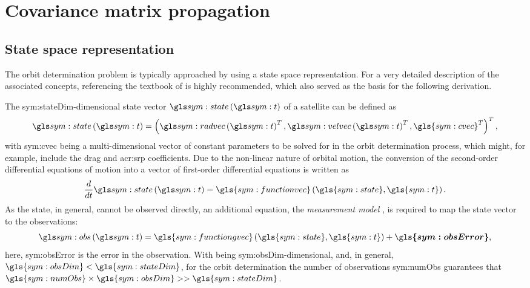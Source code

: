 \section{Covariance matrix propagation}
\label{sec:propagation-covariance}

\subsection{State space representation}
\label{sec:state-space-notation}

The orbit determination problem is typically approached by using a state space representation. For a very detailed description of the associated concepts, referencing the textbook
of \citet{tapley2004} is highly recommended, which also served as the basis for the following derivation. 

The \gls{sym:stateDim}-dimensional state vector $\xt$ of a satellite can be defined as
\begin{equation}
 \xt = \left(\rt^T, \vt^T, \gls{sym:cvec}^T \right)^T,
\end{equation}
with \gls{sym:cvec} being a multi-dimensional vector of constant parameters to be solved for in the orbit determination process, which might, for example,
include the drag and \acrshort{acr:srp} coefficients. Due to the non-linear nature of orbital motion, the conversion of the second-order differential equations of motion into a vector of first-order differential equations is written as
\begin{equation}
 \frac{d}{dt} \xt = \gls{sym:functionvec}\left(\gls{sym:state},\gls{sym:t}\right). \label{eq:non-linear-system}
\end{equation}
As the state, in general, cannot be observed directly, an additional equation, the \textit{measurement model} \citep{maybeck1979}, is required to map the state vector to the observations:
\begin{equation}
 \yt = \gls{sym:functiongvec}\left(\gls{sym:state},\gls{sym:t}\right) + \boldsymbol{\gls{sym:obsError}}, \label{eq:non-linear-obs}
\end{equation}
here, \gls{sym:obsError} is the error in the observation. With {\yt} being \gls{sym:obsDim}-dimensional, and, in general, $\gls{sym:obsDim}<\gls{sym:stateDim}$, for the orbit determination the number of 
observations \gls{sym:numObs} guarantees that $\gls{sym:numObs}\times\gls{sym:obsDim} >> \gls{sym:stateDim}$.

